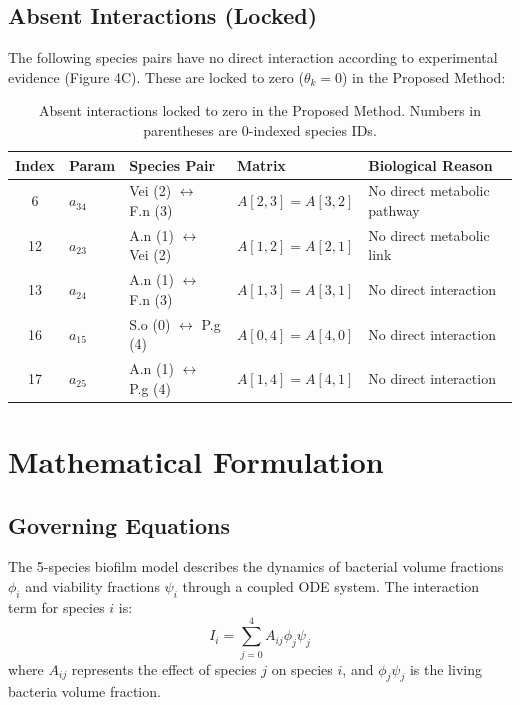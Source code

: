 \documentclass[11pt,a4paper]{article}
\begin{document}
\subsection{Absent Interactions (Locked)}

The following species pairs have no direct interaction according to experimental evidence (Figure 4C). These are locked to zero ($\theta_k = 0$) in the Proposed Method:

\begin{table}[h]
\centering
\begin{tabular}{cllll}
\toprule
\textbf{Index} & \textbf{Param} & \textbf{Species Pair} & \textbf{Matrix} & \textbf{Biological Reason} \\
\midrule
6 & $a_{34}$ & Vei (2) $\leftrightarrow$ F.n (3) & $A[2,3]=A[3,2]$ & No direct metabolic pathway \\
12 & $a_{23}$ & A.n (1) $\leftrightarrow$ Vei (2) & $A[1,2]=A[2,1]$ & No direct metabolic link \\
13 & $a_{24}$ & A.n (1) $\leftrightarrow$ F.n (3) & $A[1,3]=A[3,1]$ & No direct interaction \\
16 & $a_{15}$ & S.o (0) $\leftrightarrow$ P.g (4) & $A[0,4]=A[4,0]$ & No direct interaction \\
17 & $a_{25}$ & A.n (1) $\leftrightarrow$ P.g (4) & $A[1,4]=A[4,1]$ & No direct interaction \\
\bottomrule
\end{tabular}
\caption{Absent interactions locked to zero in the Proposed Method. Numbers in parentheses are 0-indexed species IDs.}
\label{tab:locked}
\end{table}

\section{Mathematical Formulation}

\subsection{Governing Equations}

The 5-species biofilm model \cite{Klempt2024ContinuumGrowth, Klempt2025ContinuumBiofilm} describes the dynamics of bacterial volume fractions $\phi_i$ and viability fractions $\psi_i$ through a coupled ODE system. The interaction term for species $i$ is:
\begin{equation}
I_i = \sum_{j=0}^{4} A_{ij} \phi_j \psi_j
\end{equation}
where $A_{ij}$ represents the effect of species $j$ on species $i$, and $\phi_j \psi_j$ is the living bacteria volume fraction.
\end{document}
